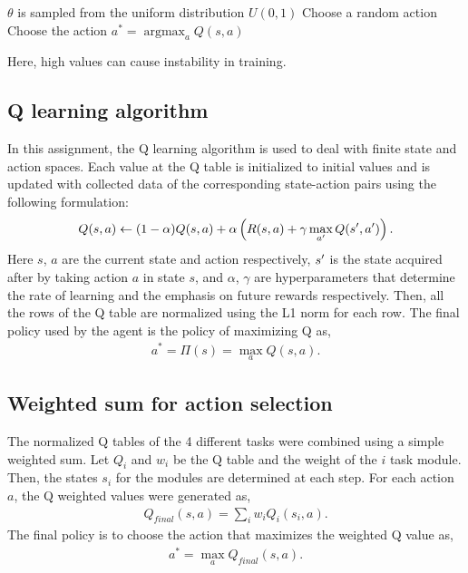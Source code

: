 \documentclass[conference]{IEEEtran}
\begin{document}
\begin{algorithmic}
\State $\theta$ is sampled from the uniform distribution $U(0,1)$
\If{$\theta < \epsilon$} 
    \State Choose a random action
\ElsIf{$\theta \leq \epsilon$}
	\State Choose the action $a^*=\operatorname*{argmax}_a Q(s,a)$
\EndIf 
\end{algorithmic}
Here, high values can cause instability in training.

\subsection{Q learning algorithm}
In this assignment, the Q learning algorithm is used to deal with finite state and action spaces.
Each value at the Q table is initialized to initial values and is updated with collected data of the
corresponding state-action pairs using the following formulation:
\begin{equation}
\begin{aligned}
\label{eq:q}
Q(s, a) \leftarrow (1 - \alpha) Q(s, a) + \alpha \left(R(s, a) + \gamma \max_{a\sp{\prime}}
Q(s\sp{\prime}, a\sp{\prime})
\right).
\end{aligned}
\end{equation}
Here $s$, $a$ are the current state and action respectively, $s\sp{\prime}$ is
the state acquired after by taking action $a$ in state $s$, and $\alpha$, $\gamma$ are hyperparameters that determine the rate of learning and the emphasis on future rewards respectively.
Then, all the rows of the Q table are normalized using the L1 norm for each row. 
The final policy used by the agent is the policy of maximizing Q as,
\begin{equation}
\begin{aligned}
a^{*} = \Pi (s)=\max_{a} Q(s, a).
\end{aligned}
\end{equation}

\subsection{Weighted sum for action selection}
The normalized Q tables of the 4 different tasks were combined using a simple weighted sum.
Let $Q_i$ and $w_i$ be the Q table and the weight of the $i$ task module.
Then, the states $s_i$ for the modules are determined at each step.
For each action $a$, the Q weighted values were generated as,
\begin{equation}
\begin{aligned}
Q_{final}(s, a) = \sum_{i} w_i Q_i(s_i, a).
\end{aligned}
\end{equation}
The final policy is to choose the action that maximizes the weighted Q value as,
\begin{equation}
\begin{aligned}
a^{*} = \max_{a} Q_{final}(s, a).
\end{aligned}
\end{equation}
\end{document}
